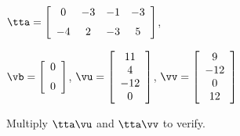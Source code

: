 {$\tta = \left[ \begin {array}{cccc} 0 & -3 & -1 & -3 \\ \noalign{\medskip} -4 & 2 & -3 & 5 \end {array} \right] $, 

$\vb=\left[ \begin {array}{c} 0\\ \noalign{\medskip}0 \end {array} \right] $, 
$\vu = \left[ \begin {array}{c} 11 \\ 4 \\ -12 \\ 0 \end{array} \right]$, 
$\vv = \left[ \begin{array}{c} 9\\ -12\\ 0 \\ 12 \end{array} \right] $}
{Multiply $\tta\vu$ and $\tta\vv$ to verify.}





